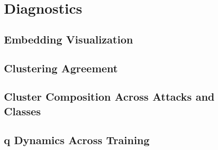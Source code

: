 \section{Diagnostics}


\subsection{Embedding Visualization}

\subsection{Clustering Agreement}

\subsection{Cluster Composition Across Attacks and Classes}

\subsection{q Dynamics Across Training}     